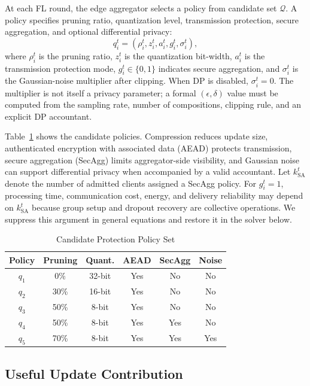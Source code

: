 \documentclass[preprint,12pt]{elsarticle}
\begin{document}
At each FL round, the edge aggregator selects a policy from candidate set $\mathcal{Q}$. A policy specifies pruning ratio, quantization level, transmission protection, secure aggregation, and optional differential privacy:
\begin{equation}
	q_i^t = \left(\rho_i^t, z_i^t, a_i^t, g_i^t, \sigma_i^t\right),
	\label{eq:policy_tuple}
\end{equation}
where $\rho_i^t$ is the pruning ratio, $z_i^t$ is the quantization bit-width, $a_i^t$ is the transmission protection mode, $g_i^t\in\{0,1\}$ indicates secure aggregation, and $\sigma_i^t$ is the Gaussian-noise multiplier after clipping. When DP is disabled, $\sigma_i^t=0$. The multiplier is not itself a privacy parameter; a formal $(\epsilon,\delta)$ value must be computed from the sampling rate, number of compositions, clipping rule, and an explicit DP accountant.

Table~\ref{tab:policy_set} shows the candidate policies. Compression reduces update size, authenticated encryption with associated data (AEAD) protects transmission, secure aggregation (SecAgg) limits aggregator-side visibility, and Gaussian noise can support differential privacy when accompanied by a valid accountant. Let $k_{\mathrm{SA}}^t$ denote the number of admitted clients assigned a SecAgg policy. For $g_i^t=1$, processing time, communication cost, energy, and delivery reliability may depend on $k_{\mathrm{SA}}^t$ because group setup and dropout recovery are collective operations. We suppress this argument in general equations and restore it in the solver below.

\begin{table}[t]
	\centering
	\caption{Candidate Protection Policy Set}
	\label{tab:policy_set}
	\scriptsize
	\setlength{\tabcolsep}{3pt}
	\begin{tabular}{c c c c c c}
		\hline
		Policy & Pruning & Quant. & AEAD & SecAgg & Noise \\
		\hline
		$q_1$ & 0\%  & 32-bit & Yes & No  & No \\
		$q_2$ & 30\% & 16-bit & Yes & No  & No \\
		$q_3$ & 50\% & 8-bit  & Yes & No  & No \\
		$q_4$ & 50\% & 8-bit  & Yes & Yes & No \\
		$q_5$ & 70\% & 8-bit  & Yes & Yes & Yes \\
		\hline
	\end{tabular}
\end{table}

\subsection{Useful Update Contribution}
\end{document}
